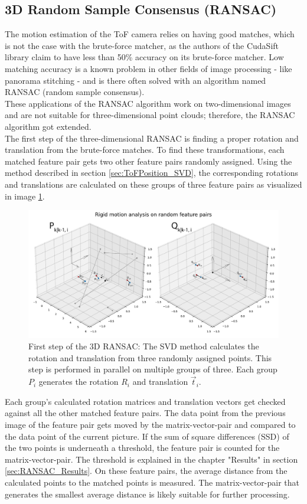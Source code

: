 \subsection{3D Random Sample Consensus (RANSAC)}
\label{sec:ToFPosition_RANSAC}
The motion estimation of the ToF camera relies on having good matches, which is not the case with the brute-force matcher, as the authors of the CudaSift library claim to have less than 50\% accuracy on its brute-force matcher.\cite{cudaSiftRepo} Low matching accuracy is a known problem in other fields of image processing - like panorama stitching - and is there often solved with an algorithm named RANSAC (random sample consensus).\\
These applications of the RANSAC algorithm work on two-dimensional images and are not suitable for three-dimensional point clouds; therefore, the RANSAC algorithm got extended.\\
The first step of the three-dimensional RANSAC is finding a proper rotation and translation from the brute-force matches. To find these transformations, each matched feature pair gets two other feature pairs randomly assigned. Using the method described in section \ref{sec:ToFPosition_SVD}, the corresponding rotations and translations are calculated on these groups of three feature pairs as visualized in image \ref{im:ransac1}.
\begin{figure}[H]
    \centering
    \includegraphics[width=1.0\textwidth]{images/ransac_3d_step1.pdf}
    \caption{First step of the 3D RANSAC: The SVD method calculates the rotation and translation from three randomly assigned points. This step is performed in parallel on multiple groups of three. Each group $P_{i}$ generates the rotation $R_{i}$ and translation $\vec{t}_{i}$.}
    \label{im:ransac1}
\end{figure}
Each group's calculated rotation matrices and translation vectors get checked against all the other matched feature pairs. The data point from the previous image of the feature pair gets moved by the matrix-vector-pair and compared to the data point of the current picture. If the sum of square differences (SSD) of the two points is underneath a threshold, the feature pair is counted for the matrix-vector-pair. The threshold is explained in the chapter "Results" in section \ref{sec:RANSAC_Results}. On these feature pairs, the average distance from the calculated points to the matched points is measured. The matrix-vector-pair that generates the smallest average distance is likely suitable for further processing.
